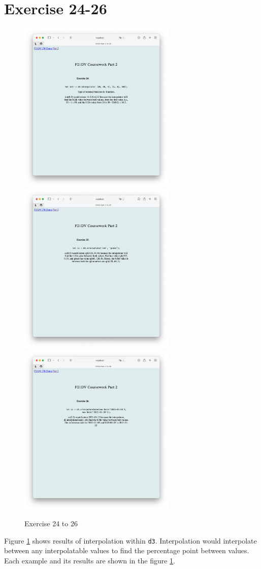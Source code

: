 \documentclass{scrreprt}
\begin{document}
\newpage
\section{Exercise 24-26}
\begin{figure}[!ht]
    \centering
    \includegraphics[width = 7.5cm]{images/ex24.png}
    \includegraphics[width = 7.5cm]{images/ex25.png}
    \includegraphics[width = 7.5cm]{images/ex26.png}
    \label{fig:ex24}
    \caption{Exercise 24 to 26}
\end{figure}
\FloatBarrier
% 
Figure \ref{fig:ex24} shows results of interpolation within \verb|d3|. Interpolation would interpolate between any interpolatable values to find the percentage point between values. Each example and its results are shown in the figure \ref{fig:ex24}.
\end{document}
